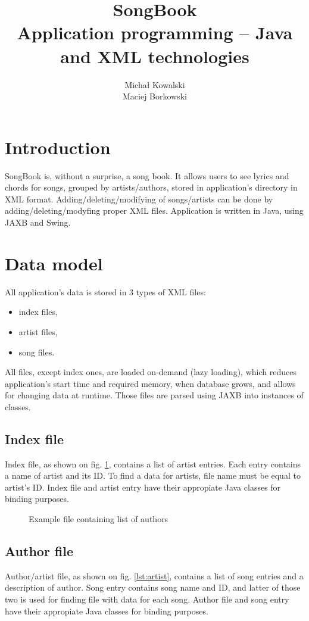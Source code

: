 \documentclass[titlepage]{article}
\title{SongBook\\ \large Application programming – Java and XML technologies}
\author{Michał Kowalski\\Maciej Borkowski}
\date{}
\begin{document}
\maketitle

\section{Introduction}
SongBook is, without a surprise, a song book. It allows users to see lyrics and
chords for songs, grouped by artists/authors, stored in application's directory
in XML format. Adding/deleting/modifying of songs/artists can be done by
adding/deleting/modyfing proper XML files. Application is written in Java, using
JAXB and Swing.

\section{Data model}
All application's data is stored in 3 types of XML files:
\begin{itemize}
  \item index files,
  \item artist files,
  \item song files.
\end{itemize}
All files, except index ones, are loaded on-demand (lazy loading), which reduces
application's start time and required memory, when database grows, and allows
for changing data at runtime. Those files are parsed using JAXB into instances
of classes.

\subsection{Index file}
Index file, as shown on fig. \ref{lst:index}, contains a list of artist entries.
Each entry contains a name of artist and its ID. To find a data for artists,
file name must be equal to artist's ID. Index file and artist entry have their
appropiate Java classes for binding purposes.

\begin{figure}

\caption{Example file containing list of authors}
\label{lst:index}
\end{figure}

\subsection{Author file}
Author/artist file, as shown on fig. \ref{lst:artist}, contains a list of song
entries and a description of author. Song entry contains song name and ID, and
latter of those two is used for finding file with data for each song. Author
file and song entry have their appropiate Java classes for binding purposes.
\end{document}
